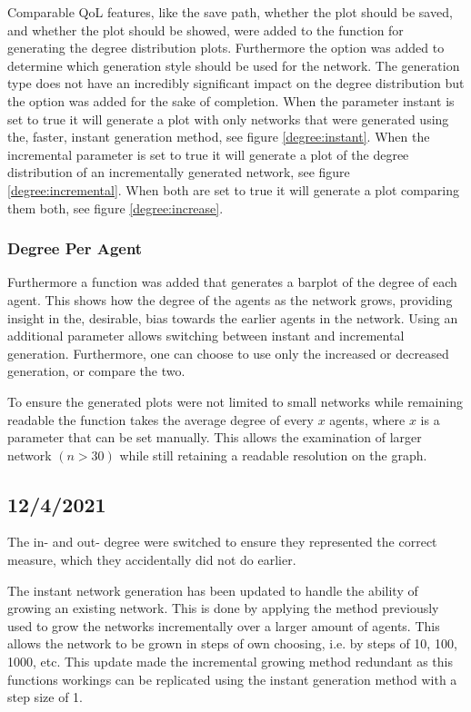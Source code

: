 \documentclass{article}
\begin{document}
Comparable QoL features, like the save path, whether the plot should be saved, and whether the plot should be showed, were added to the function for generating the degree distribution plots. \newline
Furthermore the option was added to determine which generation style should be used for the network. The generation type does not have an incredibly significant impact on the degree distribution but the option was added for the sake of completion. \newline
When the parameter instant is set to true it will generate a plot with only networks that were generated using the, faster, instant generation method, see figure \ref{degree:instant}. \newline
When the incremental parameter is set to true it will generate a plot of the degree distribution of an incrementally generated network, see figure \ref{degree:incremental}. \newline
When both are set to true it will generate a plot comparing them both, see figure \ref{degree:increase}.

\subsubsection{Degree Per Agent}
Furthermore a function was added that generates a barplot of the degree of each agent. This shows how the degree of the agents as the network grows, providing insight in the, desirable, bias towards the earlier agents in the network. Using an additional parameter allows switching between instant and incremental generation. Furthermore, one can choose to use only the increased or decreased generation, or compare the two.

To ensure the generated plots were not limited to small networks while remaining readable the function takes the average degree of every $x$ agents, where $x$ is a parameter that can be set manually. This allows the examination of larger network $(n>30)$ while still retaining a readable resolution on the graph.
\newpage
\subsection{12/4/2021}
The in- and out- degree were switched to ensure they represented the correct measure, which they accidentally did not do earlier.

The instant network generation has been updated to handle the ability of growing an existing network. This is done by applying the method previously used to grow the networks incrementally over a larger amount of agents. This allows the network to be grown in steps of own choosing, i.e. by steps of 10, 100, 1000, etc. This update made the incremental growing method redundant as this functions workings can be replicated using the instant generation method with a step size of 1.
\end{document}
